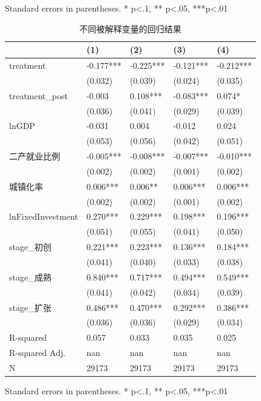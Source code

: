 \bigskip
Standard errors in parentheses. \newline 
* p<.1, ** p<.05, ***p<.01\begin{table}
\caption{不同被解释变量的回归结果}
\label{}
\begin{center}
\begin{tabular}{lllll}
\hline
                  & (1)       & (2)       & (3)       & (4)        \\
\hline
treatment         & -0.177*** & -0.225*** & -0.121*** & -0.212***  \\
                  & (0.032)   & (0.039)   & (0.024)   & (0.035)    \\
treatment\_post   & -0.003    & 0.108***  & -0.083*** & 0.074*     \\
                  & (0.036)   & (0.041)   & (0.029)   & (0.039)    \\
lnGDP             & -0.031    & 0.004     & -0.012    & 0.024      \\
                  & (0.053)   & (0.056)   & (0.042)   & (0.051)    \\
二产就业比例            & -0.005*** & -0.008*** & -0.007*** & -0.010***  \\
                  & (0.002)   & (0.002)   & (0.001)   & (0.002)    \\
城镇化率              & 0.006***  & 0.006**   & 0.006***  & 0.006***   \\
                  & (0.002)   & (0.002)   & (0.001)   & (0.002)    \\
lnFixedInvestment & 0.270***  & 0.229***  & 0.198***  & 0.196***   \\
                  & (0.051)   & (0.055)   & (0.041)   & (0.050)    \\
stage\_初创         & 0.221***  & 0.223***  & 0.136***  & 0.184***   \\
                  & (0.041)   & (0.040)   & (0.033)   & (0.038)    \\
stage\_成熟         & 0.840***  & 0.717***  & 0.494***  & 0.549***   \\
                  & (0.041)   & (0.042)   & (0.034)   & (0.039)    \\
stage\_扩张         & 0.486***  & 0.470***  & 0.292***  & 0.386***   \\
                  & (0.036)   & (0.036)   & (0.029)   & (0.034)    \\
R-squared         & 0.057     & 0.033     & 0.035     & 0.025      \\
R-squared Adj.    & nan       & nan       & nan       & nan        \\
N                 & 29173     & 29173     & 29173     & 29173      \\
\hline
\end{tabular}
\end{center}
\end{table}
\bigskip
Standard errors in parentheses. \newline 
* p<.1, ** p<.05, ***p<.01